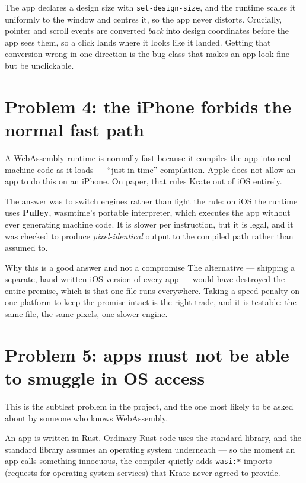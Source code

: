 \documentclass[11pt,a4paper]{report}
\begin{document}
The app declares a design size with \texttt{set-design-size}, and the
runtime scales it uniformly to the window and centres it, so the app never
distorts. Crucially, pointer and scroll events are converted \emph{back}
into design coordinates before the app sees them, so a click lands where it
looks like it landed. Getting that conversion wrong in one direction is the
bug class that makes an app look fine but be unclickable.

\section{Problem 4: the iPhone forbids the normal fast path}

A WebAssembly runtime is normally fast because it compiles the app into
real machine code as it loads --- ``just-in-time'' compilation. Apple does
not allow an app to do this on an iPhone. On paper, that rules Krate out of
iOS entirely.

The answer was to switch engines rather than fight the rule: on iOS the
runtime uses \textbf{Pulley}, wasmtime's portable interpreter, which
executes the app without ever generating machine code. It is slower per
instruction, but it is legal, and it was checked to produce
\emph{pixel-identical} output to the compiled path rather than assumed to.

\begin{plainbox}{Why this is a good answer and not a compromise}
The alternative --- shipping a separate, hand-written iOS version of every
app --- would have destroyed the entire premise, which is that one file runs
everywhere. Taking a speed penalty on one platform to keep the promise
intact is the right trade, and it is testable: the same file, the same
pixels, one slower engine.
\end{plainbox}

\section{Problem 5: apps must not be able to smuggle in OS access}

This is the subtlest problem in the project, and the one most likely to be
asked about by someone who knows WebAssembly.

An app is written in Rust. Ordinary Rust code uses the standard library,
and the standard library assumes an operating system underneath --- so the
moment an app calls something innocuous, the compiler quietly adds
\texttt{wasi:*} imports (requests for operating-system services) that Krate
never agreed to provide.
\end{document}
